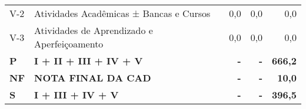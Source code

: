 \documentclass[11pt,a4paper]{article}
\begin{document}
\begin{table}[ht]
{\begin{tabular}{ll|r|r|r}
  V-2 & Atividades Acadêmicas ± Bancas e Cursos & 0,0 & 0,0 & 0,0 \\
  V-3 & Atividades de Aprendizado e Aperfeiçoamento & 0,0 & 0,0 & 0,0 \\
  \textbf{P} & \textbf{I + II + III + IV + V} & \textbf{-} & \textbf{-} & \textbf{666,2} \\
  \textbf{NF} & \textbf{NOTA FINAL DA CAD} & \textbf{-} & \textbf{-} & \textbf{10,0} \\
  \textbf{S} & \textbf{I + III + IV + V} & \textbf{-} & \textbf{-} & \textbf{396,5} \\
   \hline
\end{tabular}
}
\end{table}
\end{document}
